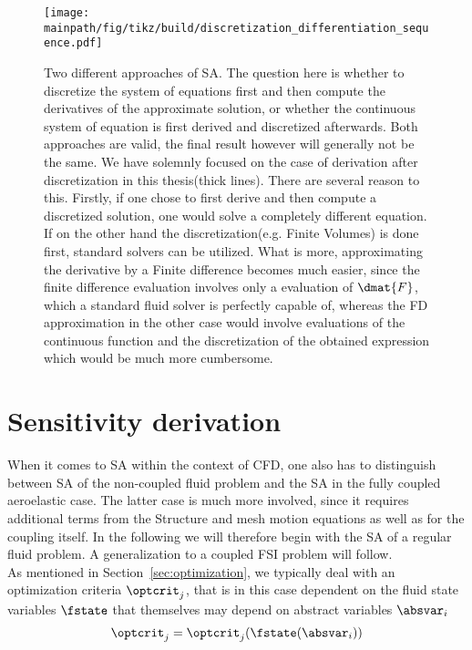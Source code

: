 \documentclass[../main.tex]{subfiles}
\begin{document}
 \begin{figure}[h!]
	\begin{center}
        \texttt{[image: \\mainpath/fig/tikz/build/discretization\_differentiation\_sequence.pdf]}
        \caption[Sensitivity Analysis approaches]{Two different approaches of \ac{SA}. The question here is whether to discretize the system of equations first and then compute the derivatives of the approximate solution, or whether the continuous system of equation is first derived and discretized afterwards. Both approaches are valid, the final result however will generally not be the same. We have solemnly focused on the case of derivation after discretization in this thesis(thick lines). There are several reason to this. Firstly, if one chose to first derive and then compute a discretized solution, one would solve a completely different equation. If on the other hand the discretization(e.g. Finite Volumes) is done first, standard solvers can be utilized. What is more, approximating the derivative by a Finite difference becomes much easier, since the finite difference evaluation involves only a evaluation of $\dmat{F}$, which a standard fluid solver is perfectly capable of, whereas the \ac{FD} approximation in the other case would involve evaluations of the continuous function and the discretization of the obtained expression which would be much more cumbersome.}
		\label{fig:discretization_differentiation_sequence}
    \end{center}
\end{figure}





\section{Sensitivity derivation}\label{sec:sensitivity_derivation}
When it comes to \ac{SA} within the context of \ac{CFD}, one also has to distinguish between \ac{SA} of the non-coupled fluid problem and the \ac{SA} in the fully coupled aeroelastic case. The latter case is much more involved, since it requires additional terms from the Structure and mesh motion equations as well as for the coupling itself. In the following we will therefore begin with the \ac{SA} of a regular fluid problem. A generalization to a coupled FSI problem will follow.
 \\


As mentioned in Section~\ref{sec:optimization}, we typically deal with an optimization criteria $\optcrit_j$, that is in this case dependent on the fluid state variables $\fstate$ that themselves may depend on abstract variables $\absvar_i$
\begin{align}
\optcrit_j=\optcrit_j(\fstate(\absvar_i))
\end{align}
\end{document}
